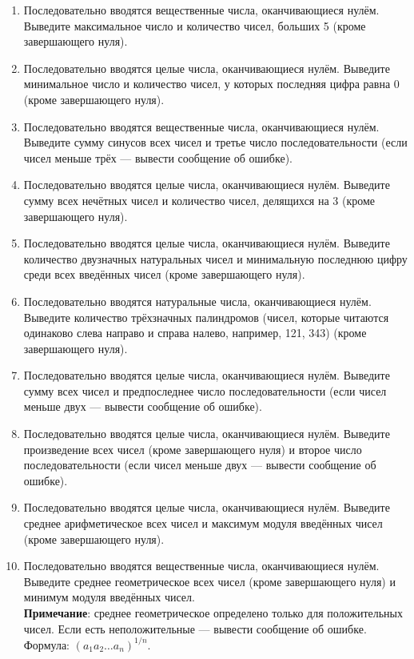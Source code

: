 \documentclass[12pt]{article}
\begin{document}
\begin{enumerate}
    \item Последовательно вводятся вещественные числа, оканчивающиеся нулём. Выведите максимальное число и количество чисел, больших 5 (кроме завершающего нуля).

    \item Последовательно вводятся целые числа, оканчивающиеся нулём. Выведите минимальное число и количество чисел, у которых последняя цифра равна 0 (кроме завершающего нуля).

    \item Последовательно вводятся вещественные числа, оканчивающиеся нулём. Выведите сумму синусов всех чисел и третье число последовательности (если чисел меньше трёх — вывести сообщение об ошибке).

    \item Последовательно вводятся целые числа, оканчивающиеся нулём. Выведите сумму всех нечётных чисел и количество чисел, делящихся на 3 (кроме завершающего нуля).

    \item Последовательно вводятся целые числа, оканчивающиеся нулём. Выведите количество двузначных натуральных чисел и минимальную последнюю цифру среди всех введённых чисел (кроме завершающего нуля).

    \item Последовательно вводятся натуральные числа, оканчивающиеся нулём. Выведите количество трёхзначных палиндромов (чисел, которые читаются одинаково слева направо и справа налево, например, 121, 343) (кроме завершающего нуля).

    \item Последовательно вводятся целые числа, оканчивающиеся нулём. Выведите сумму всех чисел и предпоследнее число последовательности (если чисел меньше двух — вывести сообщение об ошибке).

    \item Последовательно вводятся целые числа, оканчивающиеся нулём. Выведите произведение всех чисел (кроме завершающего нуля) и второе число последовательности (если чисел меньше двух — вывести сообщение об ошибке).

    \item Последовательно вводятся целые числа, оканчивающиеся нулём. Выведите среднее арифметическое всех чисел и максимум модуля введённых чисел (кроме завершающего нуля).

    \item Последовательно вводятся вещественные числа, оканчивающиеся нулём. Выведите среднее геометрическое всех чисел (кроме завершающего нуля) и минимум модуля введённых чисел. \\
    \textbf{Примечание}: среднее геометрическое определено только для положительных чисел. Если есть неположительные — вывести сообщение об ошибке. \\
    Формула: $\left(a_1 a_2 \dots a_n\right)^{1/n}$.


\end{enumerate}
\end{document}
